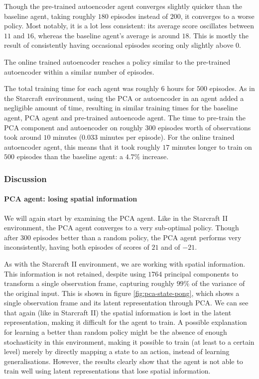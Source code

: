 Though the pre-trained autoencoder agent converges slightly quicker than the baseline agent, taking roughly $180$ episodes instead of $200$, it converges to a worse policy. Most notably, it is a lot less consistent: its average score oscillates between $11$ and $16$, whereas the baseline agent's average is around $18$. This is mostly the result of consistently having occasional episodes scoring only slightly above $0$.

The online trained autoencoder reaches a policy similar to the pre-trained autoencoder within a similar number of episodes.

The total training time for each agent was roughly 6 hours for $500$ episodes. As in the Starcraft environment, using the PCA or autoencoder in an agent added a negligible amount of time, resulting in similar training times for the baseline agent, PCA agent and pre-trained autoencode agent. The time to pre-train the PCA component and autoencoder on roughly $300$ episodes worth of observations took around $10$ minutes ($0.033$ minutes per episode). For the online trained autoencoder agent, this means that it took roughly $17$ minutes longer to train on $500$ episodes than the baseline agent: a $4.7\%$ increase.

\clearpage
\subsubsection{Discussion}\label{research-discussion-pong}
\paragraph{PCA agent: losing spatial information}
We will again start by examining the PCA agent. Like in the Starcraft II environment, the PCA agent converges to a very sub-optimal policy. Though after $300$ episodes better than a random policy, the PCA agent performs very inconsistently, having both episodes of scores of $21$ and of $-21$.

As with the Starcraft II environment, we are working with spatial information. This information is not retained, despite using $1764$ principal components to transform a single observation frame, capturing roughly $99\%$ of the variance of the original input. This is shown in figure \ref{fig:pca-state-pong}, which shows a single observation frame and its latent representation through PCA. We can see that again (like in Starcraft II) the spatial information is lost in the latent representation, making it difficult for the agent to train. A possible explanation for learning a better than random policy might be the absence of enough stochasticity in this environment, making it possible to train (at least to a certain level) merely by directly mapping a state to an action, instead of learning generalisations. However, the results clearly show that the agent is not able to train well using latent representations that lose spatial information.


